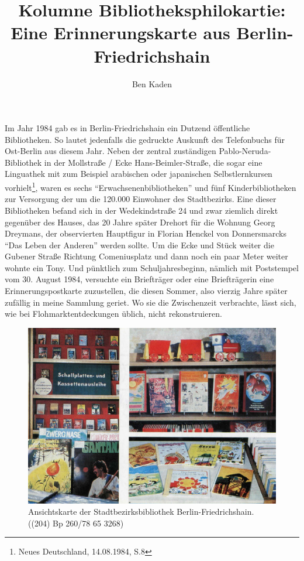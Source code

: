 \documentclass[a4paper,
fontsize=11pt,
oneside,
numbers=noperiodatend,
parskip=half-,
bibliography=totoc,
final
]{scrartcl}
\title{\LARGE{Kolumne Bibliotheksphilokartie: Eine Erinnerungskarte aus Berlin-Friedrichshain}}%
\author{Ben Kaden} %
\date{}
\begin{document}
\maketitle
\thispagestyle{fancyplain} 


Im Jahr 1984 gab es in Berlin-Friedrichshain ein Dutzend öffentliche
Bibliotheken. So lautet jedenfalls die gedruckte Auskunft des
Telefonbuchs für Ost-Berlin aus diesem Jahr. Neben der zentral
zuständigen Pablo-Neruda-Bibliothek in der Mollstraße / Ecke
Hans-Beimler-Straße, die sogar eine Linguathek mit zum Beispiel
arabischen oder japanischen Selbstlernkursen vorhielt\footnote{Neues
  Deutschland, 14.08.1984, S.8}, waren es sechs
\enquote{Erwachsenenbibliotheken} und fünf Kinderbibliotheken zur
Versorgung der um die 120.000 Einwohner des Stadtbezirks. Eine dieser
Bibliotheken befand sich in der Wedekindstraße 24 und zwar ziemlich
direkt gegenüber des Hauses, das 20 Jahre später Drehort für die Wohnung
Georg Dreymans, der observierten Hauptfigur in Florian Henckel von
Donnersmarcks \enquote{Das Leben der Anderen} werden sollte. Um die Ecke
und Stück weiter die Gubener Straße Richtung Comeniusplatz und dann noch
ein paar Meter weiter wohnte ein Tony. Und pünktlich zum
Schuljahresbeginn, nämlich mit Poststempel vom 30. August 1984,
versuchte ein Briefträger oder eine Briefträgerin eine
Erinnerungspostkarte zuzustellen, die diesen Sommer, also vierzig Jahre
später zufällig in meine Sammlung geriet. Wo sie die Zwischenzeit
verbrachte, lässt sich, wie bei Flohmarktentdeckungen üblich, nicht
rekonstruieren.

\begin{figure}
\centering
\includegraphics{img/abb1.jpg}
\caption{Ansichtskarte der Stadtbezirksbibliothek Berlin-Friedrichshain.
((204) Bp 260/78 65 3268)}
\end{figure}
\end{document}
